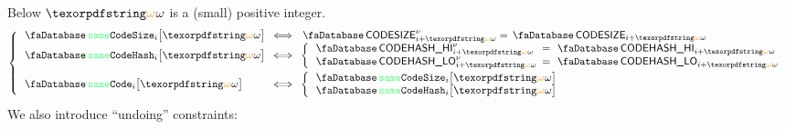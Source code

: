 Below $\relof$ is a (small) positive integer.
\[
	\left\{ \begin{array}{lcl}
		\accSameCodeSize   {i}{\relof} & \!\!\! \iff \!\!\! & \accCodesize\new_{i + \relof} = \accCodesize_{i + \relof} \\
		\accSameCodeHash   {i}{\relof} & \!\!\! \iff \!\!\! &
		\left\{ \begin{array}{lcl} 
			\accCodehashHi\new_{i + \relof}                  & \!\!\! =    \!\!\! & \accCodehashHi_{i + \relof} \\ 
			\accCodehashLo\new_{i + \relof}                  & \!\!\! =    \!\!\! & \accCodehashLo_{i + \relof} \\
		\end{array} \right. \vspace{1mm} \\
		\accSameCode       {i}{\relof} & \!\!\! \iff \!\!\! &
		\left\{ \begin{array}{lcl} 
			\accSameCodeSize   {i}{\relof} \\
			\accSameCodeHash   {i}{\relof} \\
		\end{array} \right. \\
	\end{array} \right.
\]
We also introduce ``undoing'' constraints:
